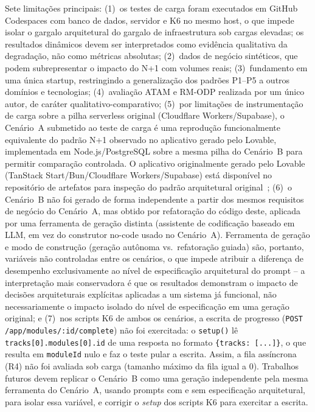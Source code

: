 \documentclass[sigconf]{acmart}
\begin{document}
Sete limitações principais: (1)~os testes de carga foram executados em GitHub
Codespaces com banco de dados, servidor e K6 no mesmo host, o que impede isolar
o gargalo arquitetural do gargalo de infraestrutura sob cargas elevadas; os
resultados dinâmicos devem ser interpretados como evidência qualitativa da
degradação, não como métricas absolutas; (2)~dados de negócio sintéticos, que
podem subrepresentar o impacto do N+1 com volumes reais; (3)~fundamento em uma
única startup, restringindo a generalização dos padrões P1--P5 a outros domínios
e tecnologias; (4)~avaliação ATAM e RM-ODP realizada por um único autor, de
caráter qualitativo-comparativo; (5)~por limitações de instrumentação de carga
sobre a pilha serverless original (Cloudflare Workers/Supabase), o Cenário~A
submetido ao teste de carga é uma reprodução funcionalmente equivalente do
padrão N+1 observado no aplicativo gerado pelo Lovable, implementada em
Node.js/PostgreSQL sobre a mesma pilha do Cenário~B para permitir comparação
controlada. O aplicativo originalmente gerado pelo Lovable (TanStack
Start/Bun/Cloudflare Workers/Supabase) está disponível no repositório de
artefatos para inspeção do padrão arquitetural original~\cite{GenAIDebt2026};
(6)~o Cenário~B não foi gerado de forma independente a partir dos mesmos requisitos
de negócio do Cenário~A, mas obtido por refatoração do código deste, aplicada por
uma ferramenta de geração distinta (assistente de codificação baseado em LLM, em vez
do construtor no-code usado no Cenário~A). Ferramenta de geração e modo de construção
(geração autônoma vs.\ refatoração guiada) são, portanto, variáveis não controladas
entre os cenários, o que impede atribuir a diferença de desempenho exclusivamente ao
nível de especificação arquitetural do prompt -- a interpretação mais conservadora é
que os resultados demonstram o impacto de decisões arquiteturais explícitas aplicadas
a um sistema já funcional, não necessariamente o impacto isolado do nível de
especificação em uma geração original; e (7)~nos scripts K6 de ambos os cenários,
a escrita de progresso (\texttt{POST /app/modules/:id/complete}) não foi exercitada:
o \texttt{setup()} lê \texttt{tracks[0].modules[0].id} de uma resposta no formato
\texttt{\{tracks: [...]\}}, o que resulta em \texttt{moduleId} nulo e faz o teste pular a escrita.
Assim, a fila assíncrona (R4) não foi avaliada sob carga (tamanho máximo da fila igual a 0).
Trabalhos futuros devem replicar o Cenário~B como uma geração independente pela mesma
ferramenta do Cenário~A, usando prompts com e sem especificação arquitetural, para isolar
essa variável, e corrigir o \textit{setup} dos scripts K6 para exercitar a escrita.
\end{document}
